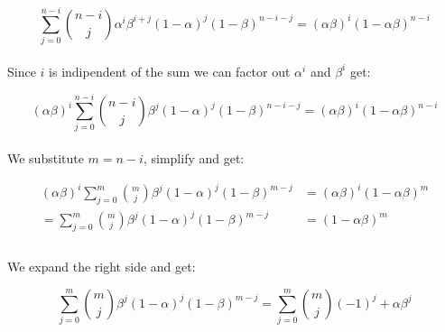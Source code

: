 \begin{equation*}
    \sum_{j=0}^{n-i} \binom{n-i}{j}\alpha^{i}\beta^{i+j}(1-\alpha)^{j}(1-\beta)^{n-i-j} = (\alpha\beta)^{i}(1-\alpha\beta)^{n-i}
\end{equation*}
\\
Since $i$ is indipendent of the sum we can factor out $\alpha^{i}$ and $\beta^{i}$ get:

\begin{equation*}
    (\alpha\beta)^{i}\sum _{j=0}^{n-i} \binom{n-i}{j}\beta^{j}(1-\alpha)^{j}(1-\beta)^{n-i-j} = (\alpha\beta)^{i}(1-\alpha\beta)^{n-i}
\end{equation*}
\\
We substitute $m=n-i$, simplify and get:

\begin{align*}
    (\alpha\beta)^{i}\sum _{j=0}^{m} \binom{m}{j}\beta^{j}(1-\alpha)^{j}(1-\beta)^{m-j} & = (\alpha\beta)^{i}(1-\alpha\beta)^{m} \\
    = \sum_{j=0}^{m} \binom{m}{j}\beta^{j}(1-\alpha)^{j}(1-\beta)^{m-j}                 & = (1-\alpha\beta)^{m}                  \\
\end{align*}
\\
We expand the right side and get:

\begin{equation*}
    \sum_{j=0}^{m} \binom{m}{j}\beta^{j}(1-\alpha)^{j}(1-\beta)^{m-j} = \sum _{j=0}^{m}\binom{m}{j}(-1)^j+\alpha\beta^{j}
\end{equation*}